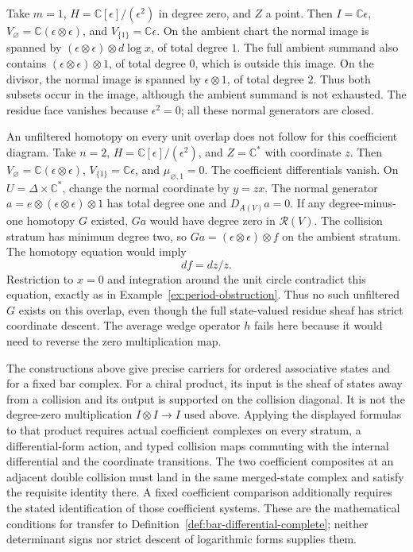 \begin{example}
Take $m=1$, $H=\mathbb C[\epsilon]/(\epsilon^2)$ in degree zero, and $Z$ a point.
Then $I=\mathbb C\epsilon$, $V_\varnothing=\mathbb C(\epsilon\otimes\epsilon)$,
and $V_{\{1\}}=\mathbb C\epsilon$.
On the ambient chart the normal image is spanned by
$(\epsilon\otimes\epsilon)\otimes d\log x$, of total degree $1$.
The full ambient summand also contains
$(\epsilon\otimes\epsilon)\otimes1$, of total degree $0$,
which is outside this image.
On the divisor, the normal image is spanned by $\epsilon\otimes1$, of total degree $2$.
Thus both subsets occur in the image, although the ambient summand is not exhausted.
The residue face vanishes because $\epsilon^2=0$; all these normal generators are closed.
\end{example}

An unfiltered homotopy on every unit overlap does not follow for this coefficient diagram.
Take $n=2$, $H=\mathbb C[\epsilon]/(\epsilon^2)$, and $Z=\mathbb C^*$ with coordinate $z$.
Then $V_\varnothing=\mathbb C(\epsilon\otimes\epsilon)$, $V_{\{1\}}=\mathbb C\epsilon$,
and $\mu_{\varnothing,1}=0$.
The coefficient differentials vanish.
On $U=\Delta\times\mathbb C^*$, change the normal coordinate by $y=zx$.
The normal generator $a=e\otimes(\epsilon\otimes\epsilon)\otimes1$ has total degree one and $D_{A(V)}a=0$.
If any degree-minus-one homotopy $G$ existed, $Ga$ would have degree zero in $\mathcal R(V)$.
The collision stratum has minimum degree two, so $Ga=(\epsilon\otimes\epsilon)\otimes f$ on the ambient stratum.
The homotopy equation would imply
\[
df=dz/z.
\]
Restriction to $x=0$ and integration around the unit circle contradict this equation, exactly as in
Example~\ref{ex:period-obstruction}.
Thus no such unfiltered $G$ exists on this overlap, even though the full state-valued residue sheaf has strict coordinate descent.
The average wedge operator $h$ fails here because it would need to reverse the zero multiplication map.

The constructions above give precise carriers for ordered associative states and for a fixed bar complex.
For a chiral product, its input is the sheaf of states away from a collision and its output is supported on the collision diagonal.
It is not the degree-zero multiplication $I\otimes I\to I$ used above.
Applying the displayed formulas to that product requires actual coefficient complexes on every stratum,
a differential-form action, and typed collision maps commuting with the internal differential and the coordinate transitions.
The two coefficient composites at an adjacent double collision must land in the same merged-state complex and satisfy the requisite identity there.
A fixed coefficient comparison additionally requires the stated identification of those coefficient systems.
These are the mathematical conditions for transfer to Definition~\ref{def:bar-differential-complete};
neither determinant signs nor strict descent of logarithmic forms supplies them.
